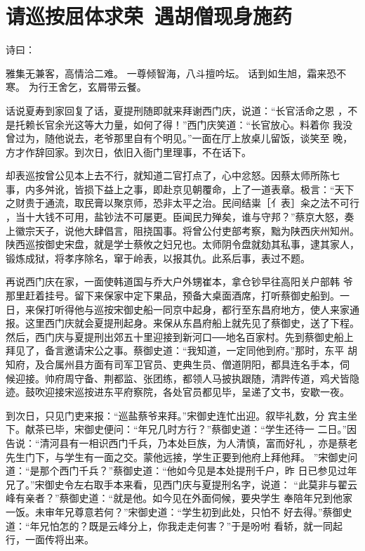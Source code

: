 \chapter{请巡按屈体求荣~遇胡僧现身施药}

诗曰：

雅集无兼客，高情洽二难。
一尊倾智海，八斗擅吟坛。
话到如生旭，霜来恐不寒。
为行王舍乞，玄屑带云餐。

话说夏寿到家回复了话，夏提刑随即就来拜谢西门庆，说道：“长官活命之恩
，不是托赖长官余光这等大力量，如何了得！”西门庆笑道：“长官放心。料着你
我没曾过为，随他说去，老爷那里自有个明见。”一面在厅上放桌儿留饭，谈笑至
晚，方才作辞回家。到次日，依旧入衙门里理事，不在话下。

却表巡按曾公见本上去不行，就知道二官打点了，心中忿怒。因蔡太师所陈七
事，内多舛讹，皆损下益上之事，即赴京见朝覆命，上了一道表章。极言：“天下
之财贵于通流，取民膏以聚京师，恐非太平之治。民间结粜［亻表］籴之法不可行
，当十大钱不可用，盐钞法不可屡更。臣闻民力殚矣，谁与守邦？”蔡京大怒，奏
上徽宗天子，说他大肆倡言，阻挠国事。将曾公付吏部考察，黜为陕西庆州知州。
陕西巡按御史宋盘，就是学士蔡攸之妇兄也。太师阴令盘就劾其私事，逮其家人，
锻炼成狱，将孝序除名，窜于岭表，以报其仇。此系后事，表过不题。

再说西门庆在家，一面使韩道国与乔大户外甥崔本，拿仓钞早往高阳关户部韩
爷那里赶着挂号。留下来保家中定下果品，预备大桌面酒席，打听蔡御史船到。一
日，来保打听得他与巡按宋御史船一同京中起身，都行至东昌府地方，使人来家通
报。这里西门庆就会夏提刑起身。来保从东昌府船上就先见了蔡御史，送了下程。
然后，西门庆与夏提刑出郊五十里迎接到新河口──地名百家村。先到蔡御史船上
拜见了，备言邀请宋公之事。蔡御史道：“我知道，一定同他到府。”那时，东平
胡知府，及合属州县方面有司军卫官员、吏典生员、僧道阴阳，都具连名手本，伺
候迎接。帅府周守备、荆都监、张团练，都领人马披执跟随，清跸传道，鸡犬皆隐
迹。鼓吹迎接宋巡按进东平府察院，各处官员都见毕，呈递了文书，安歇一夜。

到次日，只见门吏来报：“巡盐蔡爷来拜。”宋御史连忙出迎。叙毕礼数，分
宾主坐下。献茶已毕，宋御史便问：“年兄几时方行？”蔡御史道：“学生还待一
二日。”因告说：“清河县有一相识西门千兵，乃本处巨族，为人清慎，富而好礼
，亦是蔡老先生门下，与学生有一面之交。蒙他远接，学生正要到他府上拜他拜。
”宋御史问道：“是那个西门千兵？”蔡御史道：“他如今见是本处提刑千户，昨
日已参见过年兄了。”宋御史令左右取手本来看，见西门庆与夏提刑名字，说道：
“此莫非与翟云峰有亲者？”蔡御史道：“就是他。如今见在外面伺候，要央学生
奉陪年兄到他家一饭。未审年兄尊意若何？”宋御史道：“学生初到此处，只怕不
好去得。”蔡御史道：“年兄怕怎的？既是云峰分上，你我走走何害？”于是吩咐
看轿，就一同起行，一面传将出来。

